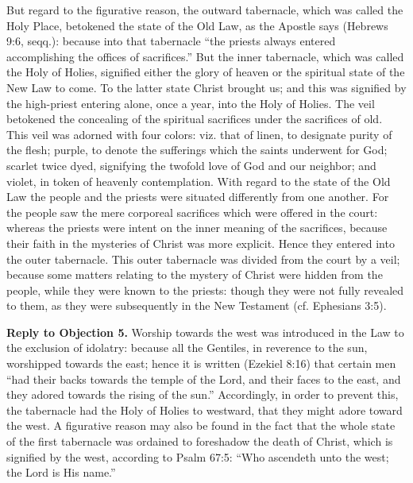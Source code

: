 But regard to the figurative reason, the outward tabernacle, which was called the Holy Place, betokened the state of the Old Law, as the Apostle says (Hebrews 9:6, seqq.): because into that tabernacle ``the priests always entered accomplishing the offices of sacrifices.'' But the inner tabernacle, which was called the Holy of Holies, signified either the glory of heaven or the spiritual state of the New Law to come. To the latter state Christ brought us; and this was signified by the high-priest entering alone, once a year, into the Holy of Holies. The veil betokened the concealing of the spiritual sacrifices under the sacrifices of old. This veil was adorned with four colors: viz. that of linen, to designate purity of the flesh; purple, to denote the sufferings which the saints underwent for God; scarlet twice dyed, signifying the twofold love of God and our neighbor; and violet, in token of heavenly contemplation. With regard to the state of the Old Law the people and the priests were situated differently from one another. For the people saw the mere corporeal sacrifices which were offered in the court: whereas the priests were intent on the inner meaning of the sacrifices, because their faith in the mysteries of Christ was more explicit. Hence they entered into the outer tabernacle. This outer tabernacle was divided from the court by a veil; because some matters relating to the mystery of Christ were hidden from the people, while they were known to the priests: though they were not fully revealed to them, as they were subsequently in the New Testament (cf. Ephesians 3:5).

\textbf{Reply to Objection 5.} Worship towards the west was introduced in the Law to the exclusion of idolatry: because all the Gentiles, in reverence to the sun, worshipped towards the east; hence it is written (Ezekiel 8:16) that certain men ``had their backs towards the temple of the Lord, and their faces to the east, and they adored towards the rising of the sun.'' Accordingly, in order to prevent this, the tabernacle had the Holy of Holies to westward, that they might adore toward the west. A figurative reason may also be found in the fact that the whole state of the first tabernacle was ordained to foreshadow the death of Christ, which is signified by the west, according to Psalm 67:5: ``Who ascendeth unto the west; the Lord is His name.''

